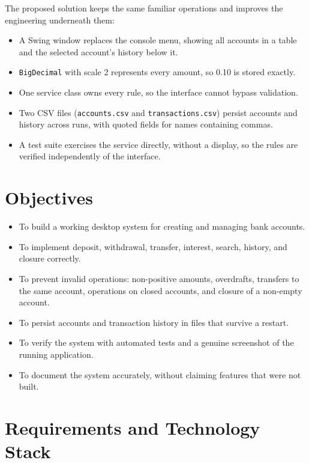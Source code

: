 \documentclass[11pt,a4paper]{report}
\begin{document}
The proposed solution keeps the same familiar operations and improves the engineering underneath them:
\begin{itemize}
    \item A Swing window replaces the console menu, showing all accounts in a table and the selected account's history below it.
    \item \texttt{BigDecimal} with scale 2 represents every amount, so 0.10 is stored exactly.
    \item One service class owns every rule, so the interface cannot bypass validation.
    \item Two CSV files (\texttt{accounts.csv} and \texttt{transactions.csv}) persist accounts and history across runs, with quoted fields for names containing commas.
    \item A test suite exercises the service directly, without a display, so the rules are verified independently of the interface.
\end{itemize}

\section{Objectives}
\begin{itemize}
    \item To build a working desktop system for creating and managing bank accounts.
    \item To implement deposit, withdrawal, transfer, interest, search, history, and closure correctly.
    \item To prevent invalid operations: non-positive amounts, overdrafts, transfers to the same account, operations on closed accounts, and closure of a non-empty account.
    \item To persist accounts and transaction history in files that survive a restart.
    \item To verify the system with automated tests and a genuine screenshot of the running application.
    \item To document the system accurately, without claiming features that were not built.
\end{itemize}

\section{Requirements and Technology Stack}
\end{document}
